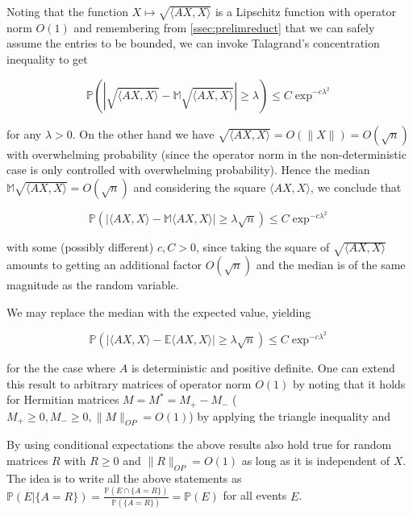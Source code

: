 Noting that the function $X\mapsto \sqrt{\langle AX,X\rangle}$ is a Lipschitz function with operator norm $O(1)$ and remembering from \ref{ssec:prelimreduct} that we can safely assume the entries to be bounded, we can invoke Talagrand's concentration inequality to get 

$$\mathbb P(|\sqrt{\langle AX,X\rangle}-\mathbb M\sqrt{\langle AX,X\rangle}|\geq\lambda)\leq C\exp^{-c\lambda^2}$$

for any $\lambda>0$. On the other hand we have $\sqrt{\langle AX,X\rangle}=O(\|X\|)=O(\sqrt n)$ with overwhelming probability (since the operator norm in the non-deterministic case is only controlled with overwhelming probability). Hence the median $\mathbb M\sqrt{\langle AX,X\rangle}=O(\sqrt n)$ and considering the square $\langle AX,X\rangle$, we conclude that

$$\mathbb P(|\langle AX,X\rangle-\mathbb M\langle AX,X\rangle|\geq\lambda\sqrt n)\leq C\exp^{-c\lambda^2}$$

with some (possibly different) $c,C>0$, since taking the square of $\sqrt{\langle AX,X\rangle}$ amounts to getting an additional factor $O(\sqrt n)$ and the median is of the same magnitude as the random variable.

We may replace the median with the expected value, yielding

\begin{equation}\label{eq:concentrationOfXRXAroundTrR}
	\mathbb P(|\langle AX,X\rangle-\mathbb E\langle AX,X\rangle|\geq\lambda\sqrt n)\leq C\exp^{-c\lambda^2}
\end{equation}

for the the case where $A$ is deterministic and positive definite. One can extend this result to arbitrary matrices of operator norm $O(1)$ by noting that it holds for Hermitian matrices $M=M^*=M_+-M_-$ ($M_+\geq 0,M_-\geq 0,\|M\|_{OP}=O(1)$) by applying the triangle inequality and %

\begin{remark}\label{rem:conditionalExpectationForDeterministicResult}
	By using conditional expectations the above results also hold true for random matrices $R$ with $R\geq 0$ and $\|R\|_{OP}=O(1)$ as long as it is independent of $X$. The idea is to write all the above statements as $\mathbb P(E|\{A=R\})=\frac{\mathbb P(E\cap\{A=R\})}{\mathbb P(\{A=R\})}=\mathbb P(E)$ for all events $E$.
\end{remark}

